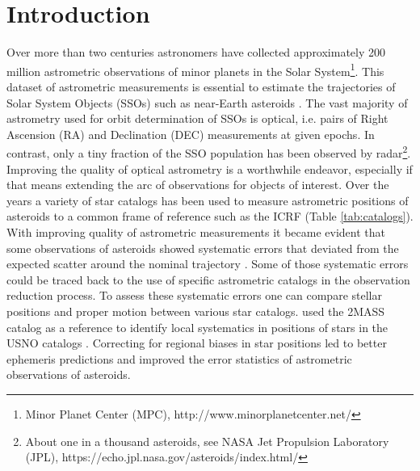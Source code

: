 \documentclass[review]{elsarticle}
\begin{document}
\section{Introduction}
Over more than two centuries astronomers have collected approximately 200 million astrometric observations of minor planets in the Solar System\footnote{Minor Planet Center (MPC), http://www.minorplanetcenter.net/}.
This dataset %
of astrometric measurements is essential to estimate the trajectories of Solar System Objects (SSOs) such as near-Earth asteroids \citep{milani10}. The vast majority of astrometry used for orbit determination of SSOs is optical, i.e. pairs of Right Ascension (RA) and Declination (DEC) measurements at given epochs. In contrast, only a tiny fraction of the SSO population has been observed by radar\footnote{About one in a thousand asteroids, see NASA Jet Propulsion Laboratory (JPL), https://echo.jpl.nasa.gov/asteroids/index.html/}. Improving the quality of optical astrometry is a worthwhile endeavor, especially if that means extending the arc of observations for objects of interest.  
%
Over the years a variety of star catalogs has been used to measure astrometric positions of asteroids to a common frame of reference such as the ICRF \citep{icrf2} (Table \ref{tab:catalogs}).
With improving quality of astrometric measurements it became evident that some observations of asteroids showed systematic errors that deviated from the expected scatter around the nominal trajectory \citep{carpino03}.  
Some of those systematic errors could be traced back to the use of specific astrometric catalogs in the observation reduction process. To assess these systematic errors one can compare stellar positions and proper motion between various star catalogs. 
\cite{chesley10} used the 2MASS \citep{2mass} catalog as a reference to identify local systematics in positions of stars in the USNO catalogs \citep{usnoa2,usnoa1,usnob1}. Correcting for regional biases in star positions led to better ephemeris predictions and improved the error statistics of astrometric observations of asteroids.
\end{document}
